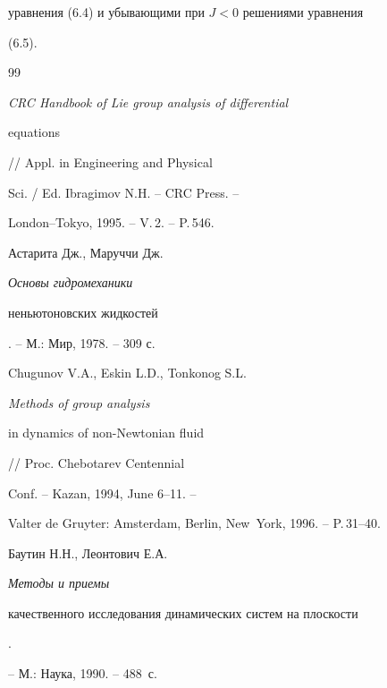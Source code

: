 уравнения (6.4) и убывающими при $J<0$ решениями уравнения 


(6.5). 


 


\begin{thebibliography}{99} 


 




{\em CRC Handbook of Lie group analysis of differential  


equations} // Appl. in Engineering and Physical  


Sci. / Ed. Ibragimov N.H. -- CRC Press. --  


London--Tokyo, 1995. -- V.\,2. -- P.\,546. 




Астарита Дж., Маруччи Дж. {\em Основы гидромеханики  


неньютоновских жидкостей}. -- М.: Мир, 1978. -- 309 с. 




Chugunov V.A., Eskin L.D., Tonkonog S.L. {\em Methods of group analysis  


in dynamics of non-Newtonian fluid} // Proc. Chebotarev Centennial 


Conf. -- Kazan, 1994, June 6--11. -- 


Valter de Gruyter: Amsterdam, Berlin, New~York, 1996. -- P.\,31--40.




Баутин Н.Н., Леонтович Е.А. {\em Методы и приемы  


качественного исследования динамических систем на плоскости}. 


-- М.: Наука, 1990. -- 488~с. 


 


\end{thebibliography} 


 


\vskip 2cm 


 








 


 


\label{end} 


 


 


